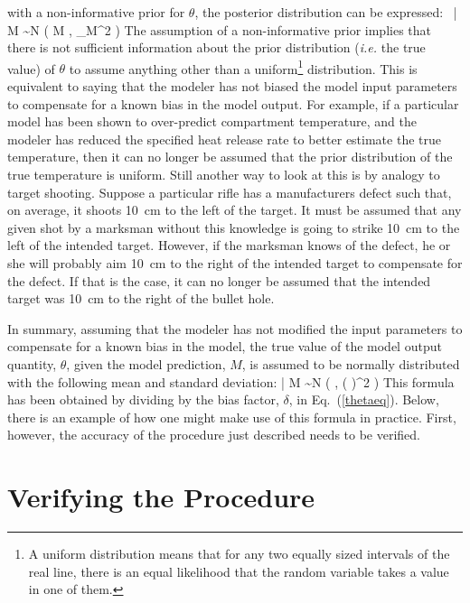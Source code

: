 with a non-informative prior for $\theta$, the posterior distribution can be expressed:
\be
   \delta \, \theta \; | \; M \sim N \left( M \; , \; \sigma_M^2 \right) \label{thetaeq}
\ee
The assumption of a non-informative prior implies that there is not sufficient information about the
prior distribution ({\em i.e.} the true value) of
$\theta$ to assume anything other than a uniform\footnote{A uniform distribution means that for any two equally sized intervals of the real line,
there is an equal likelihood that the random variable takes a value in one of them.} distribution.
This is equivalent to saying that the modeler has not biased the model input parameters to compensate for a known
bias in the model output. For example, if a particular model has been shown to over-predict compartment temperature, and the modeler has reduced the specified heat release
rate to better estimate the true temperature, then it can no longer be assumed that the prior distribution of the true temperature is uniform.
Still another way to look at this is by analogy to target shooting. Suppose a particular rifle
has a manufacturers defect such that, on average, it shoots 10~cm to the left of the target. It must be assumed that any given shot by a marksman without this knowledge is
going to strike 10~cm to the left of the intended target. However, if the marksman knows of the defect, he or she will probably aim 10~cm to the right of the
intended target to compensate for the defect. If that is the case, it can no longer be assumed that the intended target was 10~cm to the right of the bullet hole.

In summary, assuming that the modeler has not modified the input parameters to compensate for a known bias in the model,
the true value of the model output quantity, $\theta$, given the model prediction, $M$, is assumed to be normally distributed with the following mean and standard deviation:
\be
   \theta \; | \; M \sim N \left(  \; , \;  \left(  \right)^2 \right) \label{truth}
\ee
This formula has been obtained by dividing by the bias factor, $\delta$, in Eq.~(\ref{thetaeq}).
Below, there is an example of how one might make use of this formula in practice.
First, however, the accuracy of the procedure just described needs to be verified.

\section{Verifying the Procedure}

